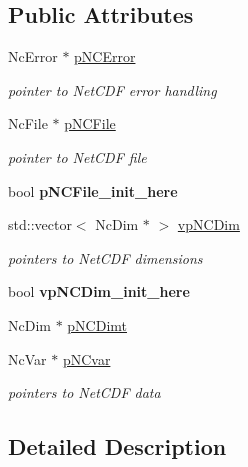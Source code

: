 \subsection*{Public Attributes}
\begin{DoxyCompactItemize}
\item 
NcError $\ast$ \hyperlink{classCImgNetCDF_ab7b0ae4b12b395794e3b0d02225130fd}{pNCError}
\begin{DoxyCompactList}\small\item\em pointer to NetCDF error handling \item\end{DoxyCompactList}\item 
NcFile $\ast$ \hyperlink{classCImgNetCDF_afc1258a75770925f6646a4291257e8f7}{pNCFile}
\begin{DoxyCompactList}\small\item\em pointer to NetCDF file \item\end{DoxyCompactList}\item 
\hypertarget{classCImgNetCDF_aea6062304914635a318edb26fef2ea99}{
bool {\bfseries pNCFile\_\-init\_\-here}}
\label{classCImgNetCDF_aea6062304914635a318edb26fef2ea99}

\item 
std::vector$<$ NcDim $\ast$ $>$ \hyperlink{classCImgNetCDF_acfe94f6cb56b1d1b8eea947473b4ce8c}{vpNCDim}
\begin{DoxyCompactList}\small\item\em pointers to NetCDF dimensions \item\end{DoxyCompactList}\item 
\hypertarget{classCImgNetCDF_ad66fbd31482a2e76e24ed7b5c3316f22}{
bool {\bfseries vpNCDim\_\-init\_\-here}}
\label{classCImgNetCDF_ad66fbd31482a2e76e24ed7b5c3316f22}

\item 
NcDim $\ast$ \hyperlink{classCImgNetCDF_a741b1e75f0973b1057f9e6d0df938bea}{pNCDimt}
\item 
NcVar $\ast$ \hyperlink{classCImgNetCDF_a2075c35a87dadc9868f8a2a8b46ca833}{pNCvar}
\begin{DoxyCompactList}\small\item\em pointers to NetCDF data \item\end{DoxyCompactList}\end{DoxyCompactItemize}


\subsection{Detailed Description}
